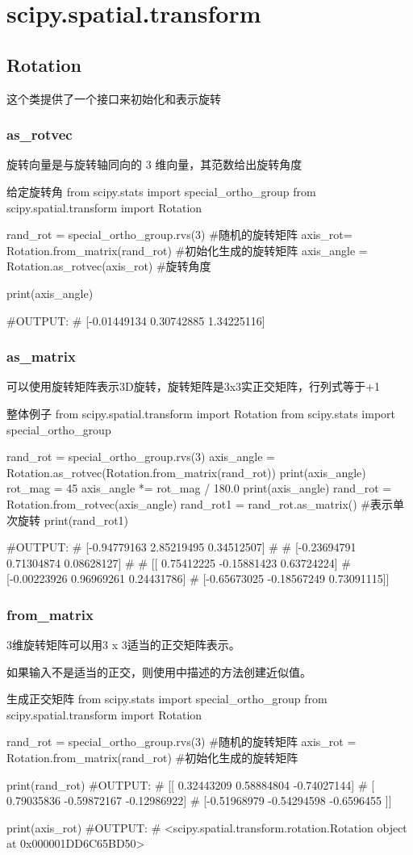 \documentclass[11pt]{article}
\begin{document}
\section{scipy.spatial.transform}
\subsection{Rotation}
这个类提供了一个接口来初始化和表示旋转
\subsubsection{as\_rotvec}
旋转向量是与旋转轴同向的 3 维向量，其范数给出旋转角度
\begin{Python}{给定旋转角}
from scipy.stats import special_ortho_group
from scipy.spatial.transform import Rotation

rand_rot = special_ortho_group.rvs(3)       #随机的旋转矩阵
axis_rot= Rotation.from_matrix(rand_rot)    #初始化生成的旋转矩阵
axis_angle = Rotation.as_rotvec(axis_rot)   #旋转角度

print(axis_angle)

#OUTPUT:
#       [-0.01449134  0.30742885  1.34225116]
\end{Python}
\subsubsection{as\_matrix}
可以使用旋转矩阵表示3D旋转，旋转矩阵是3x3实正交矩阵，行列式等于+1
\begin{Python}{整体例子}
from scipy.spatial.transform import Rotation
from scipy.stats import special_ortho_group

rand_rot = special_ortho_group.rvs(3)
axis_angle = Rotation.as_rotvec(Rotation.from_matrix(rand_rot))
print(axis_angle)
rot_mag = 45
axis_angle *= rot_mag / 180.0
print(axis_angle)
rand_rot = Rotation.from_rotvec(axis_angle)
rand_rot1 = rand_rot.as_matrix()	#表示单次旋转
print(rand_rot1)

#OUTPUT:
#       [-0.94779163  2.85219495  0.34512507]
#
#       [-0.23694791  0.71304874  0.08628127]
#
#       [[ 0.75412225 -0.15881423  0.63724224]
#        [-0.00223926  0.96969261  0.24431786]
#        [-0.65673025 -0.18567249  0.73091115]]
\end{Python}
\subsubsection{from\_matrix}
3维旋转矩阵可以用3 x 3适当的正交矩阵表示。

如果输入不是适当的正交，则使用中描述的方法创建近似值。
\begin{Python}{生成正交矩阵}
from scipy.stats import special_ortho_group
from scipy.spatial.transform import Rotation

rand_rot = special_ortho_group.rvs(3)       #随机的旋转矩阵
axis_rot = Rotation.from_matrix(rand_rot)   #初始化生成的旋转矩阵

print(rand_rot)
#OUTPUT:
#       [[ 0.32443209  0.58884804 -0.74027144]
#        [ 0.79035836 -0.59872167 -0.12986922]
#        [-0.51968979 -0.54294598 -0.6596455 ]]

print(axis_rot)
#OUTPUT:
#       <scipy.spatial.transform.rotation.Rotation object at 0x000001DD6C65BD50>
\end{Python}
\end{document}
